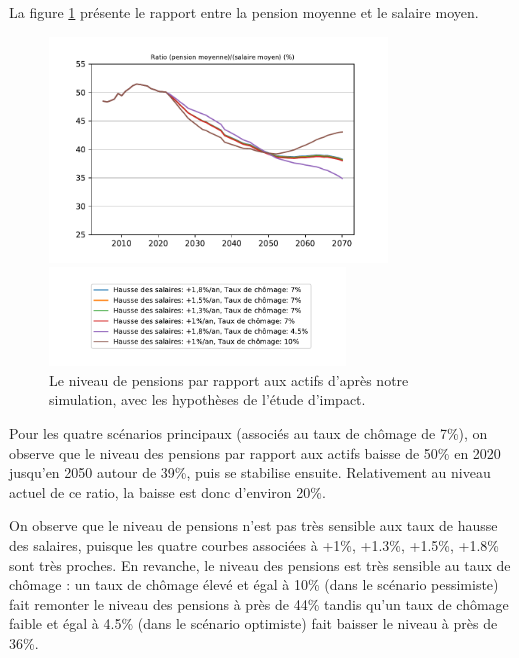 \documentclass[10pt]{article}
\begin{document}
La figure \ref{fig-simulation-P} présente le rapport entre la pension moyenne et le salaire moyen. 

\begin{figure}
\begin{center}
\includegraphics[width=0.8\textwidth]{Simulation-P.pdf}

\includegraphics[width=0.7\textwidth]{Simulation-legende.pdf}
\end{center}

\caption{Le niveau de pensions par rapport aux actifs d'après notre simulation, 
avec les hypothèses de l'étude d'impact.}
\label{fig-simulation-P}
\end{figure}

Pour les quatre scénarios principaux (associés au taux de chômage 
de 7\%), on observe que le niveau des pensions par rapport aux actifs 
baisse de 50\% en 2020 jusqu'en 2050 autour de 39\%, puis se stabilise ensuite. 
Relativement au niveau actuel de ce ratio, la baisse est donc d'environ 20\%. 

On observe que le niveau de pensions n'est pas très sensible 
aux taux de hausse des salaires, puisque les quatre courbes associées 
à +1\%, +1.3\%, +1.5\%,  +1.8\% sont très proches. 
En revanche, le niveau des pensions est très sensible au taux de chômage : 
un taux de chômage élevé et égal à 10\% (dans le scénario pessimiste) 
fait remonter le niveau des pensions à près de 44\% tandis qu'un taux de 
chômage faible et égal à 4.5\% (dans le scénario optimiste) fait baisser 
le niveau à près de 36\%. 
\end{document}
